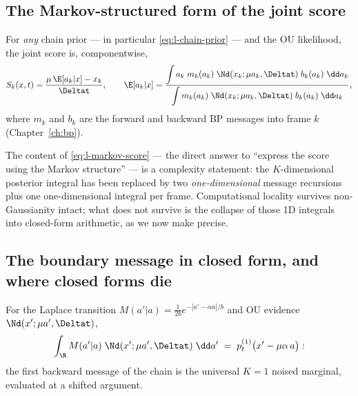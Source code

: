 \subsection{The Markov-structured form of the joint score}

\begin{theorem}\label{thm:l-markov-score}
For \emph{any} chain prior --- in particular \eqref{eq:l-chain-prior} ---
and the OU likelihood, the joint score is, componentwise,
\begin{equation}
  S_k(x, t) = \frac{\mu\, \E[a_k | x] - x_k}{\Deltat},
  \qquad
  \E[a_k | x]
  = \frac{\displaystyle\int a_k\; m_k(a_k)\; \Nd(x_k; \mu a_k, \Deltat)\;
      b_k(a_k)\;\dd a_k}
     {\displaystyle\int m_k(a_k)\; \Nd(x_k; \mu a_k, \Deltat)\;
      b_k(a_k)\;\dd a_k},
  \label{eq:l-markov-score}
\end{equation}
where $m_k$ and $b_k$ are the forward and backward BP messages into frame
$k$ (Chapter~\ref{ch:bp}).
\end{theorem}

The content of \eqref{eq:l-markov-score} --- the direct answer to
``express the score using the Markov structure'' --- is a complexity
statement: the $K$-dimensional posterior integral has been replaced by two
\emph{one-dimensional} message recursions plus one one-dimensional integral
per frame. Computational locality survives non-Gaussianity intact; what
does not survive is the collapse of those 1D integrals into closed-form
arithmetic, as we now make precise.

\subsection{The boundary message in closed form, and where closed forms
die}

\begin{proposition}\label{prop:l-onestep}
For the Laplace transition $M(a'|a) = \frac{1}{2b} e^{-|a' - \alpha a|/b}$
and OU evidence $\Nd(x'; \mu a', \Deltat)$,
\begin{equation}
  \int_\R M(a' | a)\; \Nd(x'; \mu a', \Deltat)\; \dd a'
  \;=\; p_t^{(1)}\big( x' - \mu\alpha\, a \big) :
  \label{eq:l-onestep}
\end{equation}
the first backward message of the chain is the universal $K = 1$ noised
marginal, evaluated at a shifted argument.
\end{proposition}

